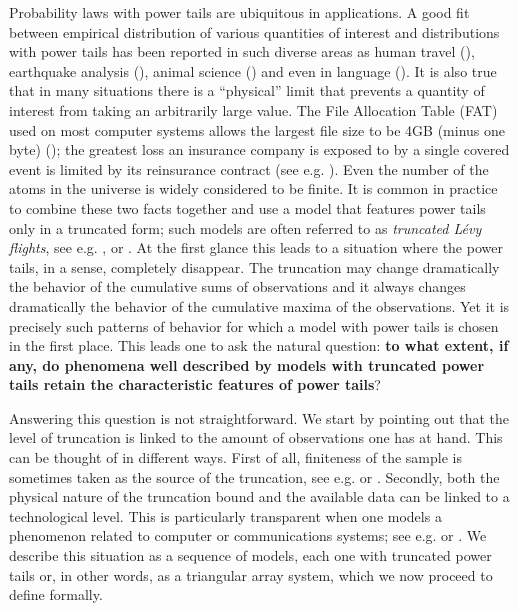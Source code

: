 \documentclass[11pt]{amsart}
\numberwithin{equation}{section}
\begin{document}
Probability laws with power tails are ubiquitous in applications.
A good fit between empirical distribution of various quantities
of interest and distributions with power tails has been reported in
such diverse areas as human travel
(\cite{brockmann:hufnagel:geisel:2006}), earthquake
analysis (\cite{corral:2006}), animal science
(\cite{bartumeus:daluz:vishwanathan:catalan:2005})
and even in language (\cite{serrano:flammini:menczer:2009}).
It is also true that in many situations there
is a ``physical'' limit that prevents a quantity of interest from
taking an arbitrarily large value. The File Allocation Table (FAT)
used on most computer systems allows the largest file size to be 4GB
(minus one byte) (\cite{microsoft:154997});
 the greatest loss an insurance company is exposed
to by a single covered event is limited by its reinsurance
contract (see e.g. \cite{mikosch:2009}). Even the number of the
atoms in the universe is widely considered to be finite. It is
common in practice to combine these two facts together and use a
model that features power tails only in a truncated form; such
models are often referred to as {\it truncated
  L\'evy flights}, see e.g. \cite{scholtz:contreras:1998},
\cite{maruyama:murakami:2003} or \cite{zaninetti:ferraro:2008}. At
the first glance this leads to a situation where the power tails,
in a sense, completely disappear. The truncation may change
dramatically the behavior of the cumulative sums of observations
and it always changes dramatically the behavior of the cumulative
maxima of the observations. Yet it is precisely such patterns of
behavior for which a model with power tails is chosen in the first
place. This leads one to ask the natural question: {\bf to what
extent, if any, do phenomena well described by models with
truncated power tails retain the characteristic features of power
tails}?

Answering this question is not straightforward. We start by
pointing out that the level of truncation is linked to the
amount of observations one has at hand. This can be thought of in
different ways. First of all, finiteness of the sample is sometimes
taken as the source of the truncation, see
e.g. \cite{burroughs:tebbens:2001} or
\cite{barthelemy:bertolotti:wiersma:2008}.
 Secondly, both the
physical nature of the truncation bound and the available data can be
linked to a technological level. This is particularly transparent when
one models a phenomenon related to computer or communications
systems; see e.g. \cite{jelenkovic:1999} or
\cite{gomez:selman:crato:kautz:2000}. We
describe this situation as a sequence of models, each one with
truncated power tails or, in other words, as a triangular array
system, which we now proceed to define formally.
\end{document}
